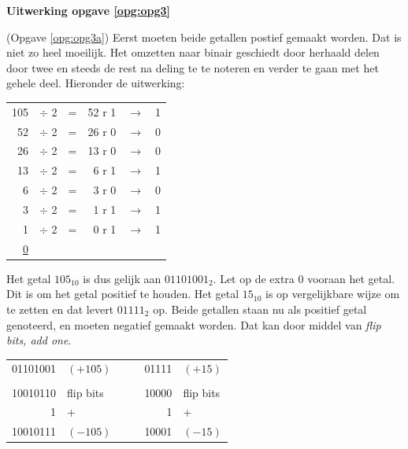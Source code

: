\documentclass[a4paper,12pt,addpoints,fleqn,dutch,concept]{tisdexam}
\begin{document}
\begin{questions}
\vspace{1em}

\textbf{Uitwerking opgave \ref{opg:opg3}}

(Opgave \ref{opg:opg3a}) Eerst moeten beide getallen postief gemaakt worden.
Dat is niet zo heel moeilijk. Het omzetten naar binair geschiedt door herhaald
delen door twee en steeds de rest na deling te te noteren en verder te gaan
met het gehele deel. Hieronder de uitwerking:

\begin{table}[H]
  \begin{tabular}{ r c c r c c }
  105 & $\div$ 2 & = & 52 r 1 & $\rightarrow$ & 1 \\
   52 & $\div$ 2 & = & 26 r 0 & $\rightarrow$ & 0 \\
   26 & $\div$ 2 & = & 13 r 0 & $\rightarrow$ & 0 \\
   13 & $\div$ 2 & = &  6 r 1 & $\rightarrow$ & 1 \\
    6 & $\div$ 2 & = &  3 r 0 & $\rightarrow$ & 0 \\
    3 & $\div$ 2 & = &  1 r 1 & $\rightarrow$ & 1 \\
    1 & $\div$ 2 & = &  0 r 1 & $\rightarrow$ & 1 \\
   \underline{0} &   &  &     &               &
  \end{tabular}
\end{table}

Het getal $105_{10}$ is dus gelijk aan $01101001_{2}$. Let op de extra 0
vooraan het getal. Dit is om het getal positief te houden. Het getal $15_{10}$ is op
vergelijkbare wijze om te zetten en dat levert $01111_{2}$ op.
Beide getallen staan nu als positief getal genoteerd, en moeten negatief
gemaakt worden. Dat kan door middel van \textit{flip bits, add one}.

\begin{table}[H]
  \begin{tabular}{ r l c c r l  }
   01101001 & $(+105)$  & & & 01111 & $(+15)$   \\
            &           & & &       &           \\
   10010110 & flip bits & & & 10000 & flip bits \\
          1 & +         & & &     1 & +         \\  \cline{1-1} \cline{5-5}
   10010111 & $(-105)$  & & & 10001 & $(-15)$
  \end{tabular}
\end{table}


\end{questions}
\end{document}
